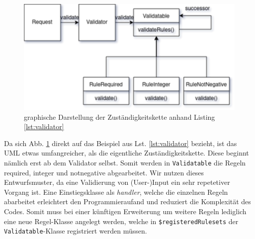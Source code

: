 \documentclass[12pt,a4paper,titlepage,ngerman,pdftex]{report}
\begin{document}
    \begin{figure}[h!]
        \centering
        \includegraphics[width=0.75\linewidth]{COR.drawio}
        \caption{graphische Darstellung der Zuständigkeitskette anhand Listing \ref{lst:validator}}
        \label{fig:cor}
    \end{figure}

    Da sich Abb. \ref{fig:cor} direkt auf das Beispiel aus Lst. \ref{lst:validator} bezieht, ist das UML etwas umfangreicher, als die eigentliche Zuständigkeitskette.
    Diese beginnt nämlich erst ab dem Validator selbst.
    Somit werden in \verb|Validatable| die Regeln required, integer und notnegative abgearbeitet.
    Wir nutzen dieses Entwurfsmuster, da eine Validierung von (User-)Input ein sehr repetetiver Vorgang ist.
    Eine Einstiegsklasse als \textit{handler}, welche die einzelnen Regeln abarbeitet erleichtert den Programmieraufand und reduziert die Komplexität des Codes.
    Somit muss bei einer künftigen Erweiterung um weitere Regeln lediglich eine neue Regel-Klasse angelegt werden, welche in \verb|$registeredRulesets| der \verb|Validatable|-Klasse registriert werden müssen.
\end{document}
